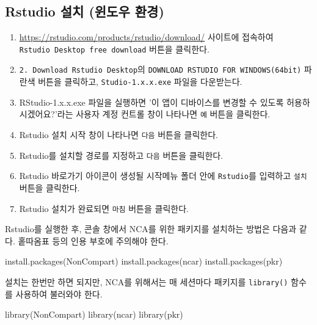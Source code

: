 \documentclass[
  11pt,
  krantz2, a4paper, twoside]{krantz}
\newenvironment{Shaded}{\begin{snugshade}}{\end{snugshade}}
\newcommand{\FunctionTok}[1]{\textcolor[rgb]{0.00,0.00,0.00}{#1}}
\newcommand{\NormalTok}[1]{#1}
\newcommand{\StringTok}[1]{\textcolor[rgb]{0.31,0.60,0.02}{#1}}
\providecommand{\tightlist}{%
  \setlength{\itemsep}{0pt}\setlength{\parskip}{0pt}}
\theoremstyle{definition}
\theoremstyle{definition}
\theoremstyle{definition}
\theoremstyle{definition}
\theoremstyle{remark}
\begin{document}
\hypertarget{rstudio-uxc124uxce58-uxc708uxb3c4uxc6b0-uxd658uxacbd}{%
\subsection{Rstudio 설치 (윈도우 환경)}\label{rstudio-uxc124uxce58-uxc708uxb3c4uxc6b0-uxd658uxacbd}}

\begin{enumerate}
\def\labelenumi{\arabic{enumi}.}
\tightlist
\item
  \url{https://rstudio.com/products/rstudio/download/} 사이트에 접속하여 \texttt{Rstudio\ Desktop\ free\ download} 버튼을 클릭한다.
\item
  \texttt{2.\ Download\ Rstudio\ Desktop}의 \texttt{DOWNLOAD\ RSTUDIO\ FOR\ WINDOWS(64bit)} 파란색 버튼을 클릭하고, \texttt{Studio-1.x.x.exe} 파일을 다운받는다.
\item
  RStudio-1.x.x.exe 파일을 실행하면 '이 앱이 디바이스를 변경할 수 있도록 허용하시겠어요?'라는 사용자 계정 컨트롤 창이 나타나면 \texttt{예} 버튼을 클릭한다.
\item
  Rstudio 설치 시작 창이 나타나면 \texttt{다음} 버튼을 클릭한다.
\item
  Rstudio를 설치할 경로를 지정하고 \texttt{다음} 버튼을 클릭한다.
\item
  Rstudio 바로가기 아이콘이 생성될 시작메뉴 폴더 안에 \texttt{Rstudio}를 입력하고 \texttt{설치} 버튼을 클릭한다.
\item
  Rstudio 설치가 완료되면 \texttt{마침} 버튼을 클릭한다.
\end{enumerate}

Rstudio를 실행한 후, 콘솔 창에서 NCA를 위한 패키지를 설치하는 방법은 다음과 같다. 홑따옴표 등의 인용 부호에 주의해야 한다.

\begin{Shaded}
\begin{Highlighting}[]
\FunctionTok{install.packages}\NormalTok{(}\StringTok{\textquotesingle{}NonCompart\textquotesingle{}}\NormalTok{)}
\FunctionTok{install.packages}\NormalTok{(}\StringTok{\textquotesingle{}ncar\textquotesingle{}}\NormalTok{)}
\FunctionTok{install.packages}\NormalTok{(}\StringTok{\textquotesingle{}pkr\textquotesingle{}}\NormalTok{)}
\end{Highlighting}
\end{Shaded}

설치는 한번만 하면 되지만, NCA를 위해서는 매 세션마다 패키지를 \texttt{library()} 함수를 사용하여 불러와야 한다.

\begin{Shaded}
\begin{Highlighting}[]
\FunctionTok{library}\NormalTok{(NonCompart)}
\FunctionTok{library}\NormalTok{(ncar)}
\FunctionTok{library}\NormalTok{(pkr)}
\end{Highlighting}
\end{Shaded}
\end{document}
